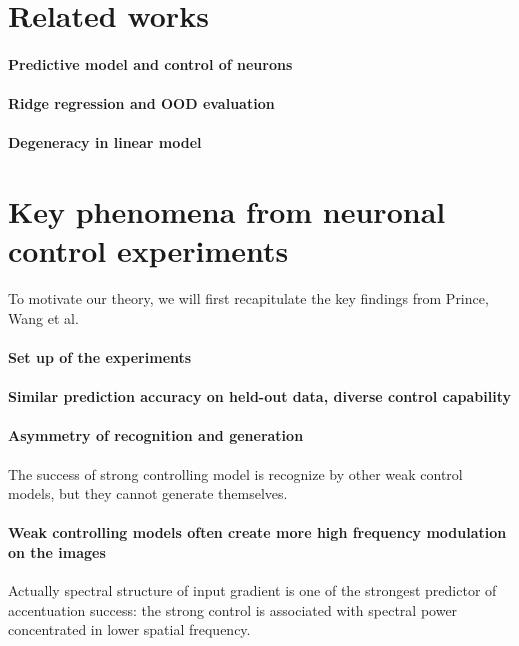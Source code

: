 \documentclass{article}
\theoremstyle{plain}
\theoremstyle{definition}
\begin{document}
\section{Related works}
\paragraph{Predictive model and control of neurons}


\paragraph{Ridge regression and OOD evaluation}

\paragraph{Degeneracy in linear model}


\section{Key phenomena from neuronal control experiments}
To motivate our theory, we will first recapitulate the key findings from Prince, Wang et al.
\paragraph{Set up of the experiments}

\paragraph{Similar prediction accuracy on held-out data, diverse control capability}


\paragraph{Asymmetry of recognition and generation}
The success of strong controlling model is recognize by other weak control models, but they cannot generate themselves.

\paragraph{Weak controlling models often create more high frequency modulation on the images}
Actually spectral structure of input gradient is one of the strongest predictor of accentuation success: the strong control is associated with spectral power concentrated in lower spatial frequency.
\end{document}
